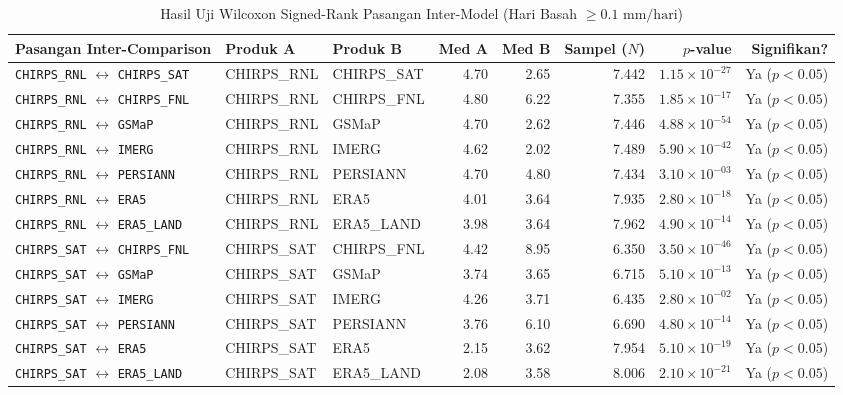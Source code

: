 \documentclass[11pt,a4paper]{article}
\begin{document}
\begin{table}[htbp]
\centering
\small
\caption{Hasil Uji Wilcoxon Signed-Rank Pasangan Inter-Model (Hari Basah $\ge 0.1\text{ mm/hari}$)}
\label{tab:wilcoxon}
\begin{tabular*}{\textwidth}{@{\extracolsep{\fill}}lllrrrrr@{}}
\toprule
\textbf{Pasangan Inter-Comparison} & \textbf{Produk A} & \textbf{Produk B} & \textbf{Med A} & \textbf{Med B} & \textbf{Sampel ($N$)} & \textbf{$p$-value} & \textbf{Signifikan?} \\
\midrule
\texttt{CHIRPS\_RNL} $\leftrightarrow$ \texttt{CHIRPS\_SAT} & CHIRPS\_RNL & CHIRPS\_SAT & 4.70 & 2.65 & 7.442 & $1.15 \times 10^{-27}$ & Ya ($p < 0.05$) \\
\texttt{CHIRPS\_RNL} $\leftrightarrow$ \texttt{CHIRPS\_FNL} & CHIRPS\_RNL & CHIRPS\_FNL & 4.80 & 6.22 & 7.355 & $1.85 \times 10^{-17}$ & Ya ($p < 0.05$) \\
\texttt{CHIRPS\_RNL} $\leftrightarrow$ \texttt{GSMaP}      & CHIRPS\_RNL & GSMaP      & 4.70 & 2.62 & 7.446 & $4.88 \times 10^{-54}$ & Ya ($p < 0.05$) \\
\texttt{CHIRPS\_RNL} $\leftrightarrow$ \texttt{IMERG}      & CHIRPS\_RNL & IMERG      & 4.62 & 2.02 & 7.489 & $5.90 \times 10^{-42}$ & Ya ($p < 0.05$) \\
\texttt{CHIRPS\_RNL} $\leftrightarrow$ \texttt{PERSIANN}   & CHIRPS\_RNL & PERSIANN   & 4.70 & 4.80 & 7.434 & $3.10 \times 10^{-03}$ & Ya ($p < 0.05$) \\
\texttt{CHIRPS\_RNL} $\leftrightarrow$ \texttt{ERA5}       & CHIRPS\_RNL & ERA5       & 4.01 & 3.64 & 7.935 & $2.80 \times 10^{-18}$ & Ya ($p < 0.05$) \\
\texttt{CHIRPS\_RNL} $\leftrightarrow$ \texttt{ERA5\_LAND}  & CHIRPS\_RNL & ERA5\_LAND  & 3.98 & 3.64 & 7.962 & $4.90 \times 10^{-14}$ & Ya ($p < 0.05$) \\
\texttt{CHIRPS\_SAT} $\leftrightarrow$ \texttt{CHIRPS\_FNL} & CHIRPS\_SAT & CHIRPS\_FNL & 4.42 & 8.95 & 6.350 & $3.50 \times 10^{-46}$ & Ya ($p < 0.05$) \\
\texttt{CHIRPS\_SAT} $\leftrightarrow$ \texttt{GSMaP}      & CHIRPS\_SAT & GSMaP      & 3.74 & 3.65 & 6.715 & $5.10 \times 10^{-13}$ & Ya ($p < 0.05$) \\
\texttt{CHIRPS\_SAT} $\leftrightarrow$ \texttt{IMERG}      & CHIRPS\_SAT & IMERG      & 4.26 & 3.71 & 6.435 & $2.80 \times 10^{-02}$ & Ya ($p < 0.05$) \\
\texttt{CHIRPS\_SAT} $\leftrightarrow$ \texttt{PERSIANN}   & CHIRPS\_SAT & PERSIANN   & 3.76 & 6.10 & 6.690 & $4.80 \times 10^{-14}$ & Ya ($p < 0.05$) \\
\texttt{CHIRPS\_SAT} $\leftrightarrow$ \texttt{ERA5}       & CHIRPS\_SAT & ERA5       & 2.15 & 3.62 & 7.954 & $5.10 \times 10^{-19}$ & Ya ($p < 0.05$) \\
\texttt{CHIRPS\_SAT} $\leftrightarrow$ \texttt{ERA5\_LAND}  & CHIRPS\_SAT & ERA5\_LAND  & 2.08 & 3.58 & 8.006 & $2.10 \times 10^{-21}$ & Ya ($p < 0.05$) \\
\bottomrule
\end{tabular*}
\end{table}
\end{document}
